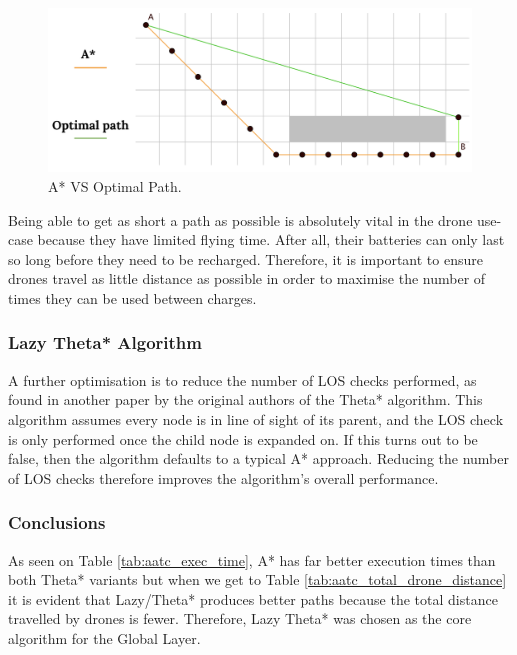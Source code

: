 \documentclass[a4paper,12pt,titlepage]{article}
\begin{document}
\begin{figure}[!hbpt]
  \center
  \includegraphics[width=\linewidth]{img/a_star_vs_optimal.png}
  \caption{A* VS Optimal Path. \cite{Balaji2017}}
  \label{fig:a_star_vs_optimal}
\end{figure}

Being able to get as short a path as possible is absolutely vital in the drone use-case because they have limited flying time. After all, their batteries can only last so long before they need to be recharged. Therefore, it is important to ensure drones travel as little distance as possible in order to maximise the number of times they can be used between charges.

\subsubsection{Lazy Theta* Algorithm}
A further optimisation is to reduce the number of LOS checks performed, as found in another paper by the original authors of the Theta* algorithm\cite{Nash2010}. This algorithm assumes every node is in line of sight of its parent, and the LOS check is only performed once the child node is expanded on. If this turns out to be false, then the algorithm defaults to a typical A* approach. Reducing the number of LOS checks therefore improves the algorithm's overall performance.

\subsubsection{Conclusions}
As seen on Table \ref{tab:aatc_exec_time}, A* has far better execution times than both Theta* variants but when we get to Table \ref{tab:aatc_total_drone_distance} it is evident that Lazy/Theta* produces better paths because the total distance travelled by drones is fewer. Therefore, Lazy Theta* was chosen as the core algorithm for the Global Layer.
\end{document}
